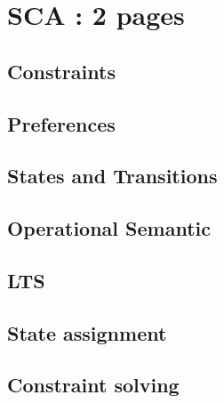 \section{SCA : 2 pages}
\subsection*{Constraints}
\subsection*{Preferences}
\subsection*{States and Transitions}
\subsection*{Operational Semantic}
\subsection*{LTS}
\subsection*{State assignment}
\subsection*{Constraint solving}

